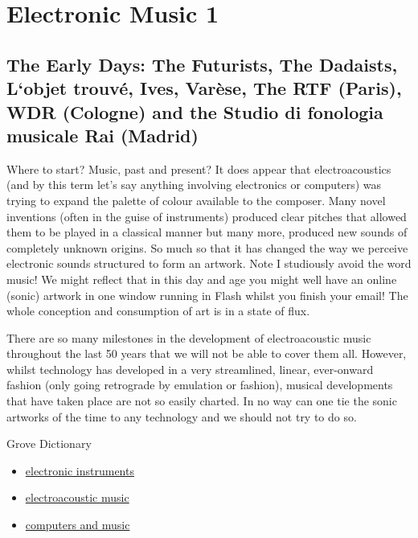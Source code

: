 
\chapter{Electronic Music 1}
\label{history1}

\section{The Early Days: The Futurists, The Dadaists, L`objet trouv\'e, Ives, Var\`ese, The RTF (Paris), WDR (Cologne) and the Studio di fonologia musicale Rai (Madrid)}

Where to start? Music, past and present? It does appear that electroacoustics (and by this term let's say anything involving electronics or computers) was trying to expand the palette of colour available to the composer. Many novel inventions (often in the guise of instruments) produced clear pitches that allowed them to be played in a classical manner but many more, produced new sounds of completely unknown origins. So much so that it has changed the way we perceive electronic sounds structured to form an artwork. Note I studiously avoid the word music! We might reflect that in this day and age you might well have an online (sonic) artwork in one window running in Flash whilst you finish your email! The whole conception and consumption of art is in a state of flux.

There are so many milestones in the development of electroacoustic music throughout the last 50 years that we will not be able to cover them all. However, whilst technology has developed in a very streamlined, linear, ever-onward fashion (only going retrograde by emulation or fashion), musical developments that have taken place are not so easily charted. In no way can one tie the sonic artworks of the time to any technology and we should not try to do so.

Grove Dictionary
\begin{itemize}
\item \href{http://www.grovemusic.com/shared/views/article.html?from=search&session_search_id=1011869954&session_name=e09647b5a66fbfeb&hitnum=1&section=music.08694&start=1&query=electronic%20instruments&search_subview=search_subject}{electronic instruments}
\item \href{http://www.grovemusic.com/shared/views/article.html?section=music.08695}{electroacoustic music}
\item \href{http://www.grovemusic.com/shared/views/article.html?section=music.40583}{computers and music}
\end{itemize}

